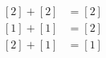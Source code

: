 \documentclass[preview]{standalone}
\begin{document}
\begin{align*}
\begin{aligned}\left[2\right] + \left[2\right] &= \left[2\right] \\\left[1\right] + \left[1\right] &= \left[2\right] \\\left[2\right] + \left[1\right] &= \left[1\right]\end{aligned}
\end{align*}
\end{document}
